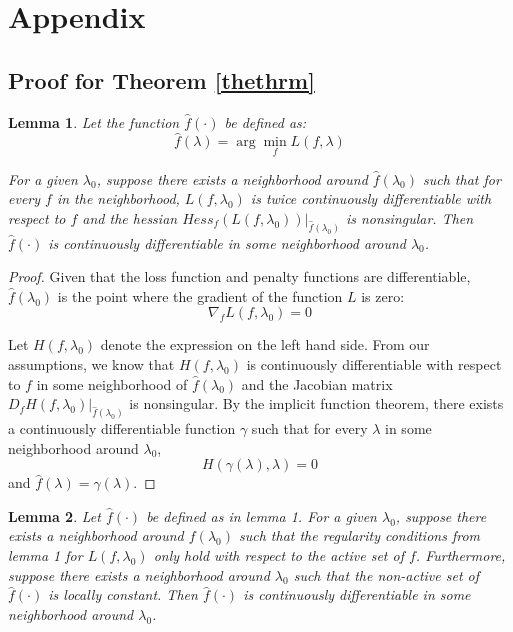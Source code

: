 \documentclass[10pt,letterpaper]{article}
\newtheorem{lemma}{Lemma}
\begin{document}
\section*{Appendix}

\subsection{Proof for Theorem \ref{thethrm}}

\begin{lemma}
Let the function $\hat f(\cdot)$ be defined as:
\begin{equation}
\hat f(\lambda) = \arg\min_f L(f, \lambda)
\end{equation}

For a given $\lambda_0$, suppose there exists a neighborhood around $\hat f(\lambda_0)$ such that for every $f$ in the neighborhood, $L(f, \lambda_0)$ is twice continuously differentiable with respect to $f$ and the hessian $Hess_f(L(f, \lambda_0))|_{\hat f(\lambda_0)}$ is nonsingular.
Then $\hat f(\cdot)$ is continuously differentiable in some neighborhood around $\lambda_0$.
\label{differentiablethrm}
\end{lemma}

\begin{proof}
Given that the loss function and penalty functions are differentiable, $\hat f(\lambda_0)$ is the point where the gradient of the function $L$ is zero:
\begin{equation}
\nabla_{f} L(f, \lambda_0) = 0
\end{equation}

Let $H(f, \lambda_0)$ denote the expression on the left hand side. From our assumptions, we know that $H(f, \lambda_0)$ is continuously differentiable with respect to $f$ in some neighborhood of $\hat f(\lambda_0)$ and the Jacobian matrix $D_f H(f, \lambda_0) |_{\hat f(\lambda_0)}$ is nonsingular. By the implicit function theorem, there exists a continuously differentiable function $\gamma$ such that for every $\lambda$ in some neighborhood around $\lambda_0$,
\begin{equation}
H(\gamma(\lambda), \lambda) = 0
\end{equation}
and
$\hat f(\lambda) = \gamma(\lambda)$.

\end{proof}

\begin{lemma}
Let $\hat f(\cdot)$ be defined as in lemma 1. For a given $\lambda_0$, suppose there exists a neighborhood around $f(\lambda_0)$ such that the regularity conditions from lemma 1 for $L(f, \lambda_0)$ only hold with respect to the active set of $f$. Furthermore, suppose there exists a neighborhood around $\lambda_0$ such that the non-active set of $\hat f(\cdot)$ is locally constant. Then $\hat f(\cdot)$ is continuously differentiable in some neighborhood around $\lambda_0$.
\label{activesetthrm}
\end{lemma}
\end{document}
